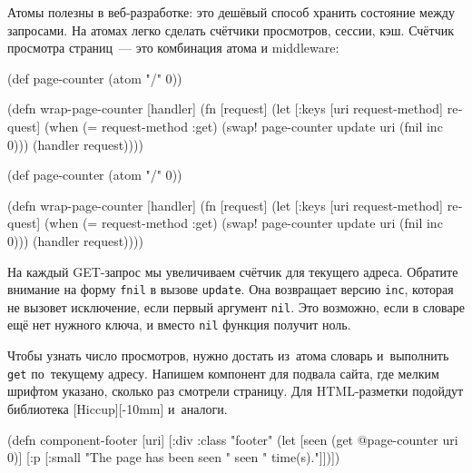 
Атомы полезны в веб-разработке: это дешёвый способ хранить состояние между
запросами. На атомах легко сделать счётчики просмотров, сессии, кэш. Счётчик
просмотра страниц~--- это комбинация атома и middleware:

\ifx\DEVICETYPE\MOBILE

\begin{english}
  \begin{clojure}
(def page-counter
  (atom {"/" 0}))

(defn wrap-page-counter
  [handler]
  (fn [request]
    (let [{:keys [uri request-method]}
          request]
      (when (= request-method :get)
        (swap! page-counter
          update uri (fnil inc 0)))
      (handler request))))
  \end{clojure}
\end{english}

\else

\begin{english}
  \begin{clojure}
(def page-counter
  (atom {"/" 0}))

(defn wrap-page-counter
  [handler]
  (fn [request]
    (let [{:keys [uri
                  request-method]} request]
      (when (= request-method :get)
        (swap! page-counter update uri (fnil inc 0)))
      (handler request))))
  \end{clojure}
\end{english}

\fi


На каждый GET-запрос мы увеличиваем счётчик для текущего адреса. Обратите
внимание на форму \verb|fnil| в вызове \verb|update|. Она возвращает версию
\verb|inc|, которая не вызовет исключение, если первый аргумент
\verb|nil|. Это возможно, если в словаре ещё нет нужного ключа, и вместо
\verb|nil| функция получит ноль.


Чтобы узнать число просмотров, нужно достать из~атома словарь и~выполнить
\verb|get| по~текущему адресу. Напишем компонент для подвала сайта, где мелким
шрифтом указано, сколько раз смотрели страницу. Для HTML-разметки подойдут
библиотека [Hiccup][-10mm]
и~аналоги.

\ifx\DEVICETYPE\MOBILE

\begin{english}
  \begin{clojure}
(defn component-footer [uri]
  [:div {:class "footer"}
   (let [seen (get @page-counter uri 0)]
     [:p [:small
          "The page has been seen " seen
          " time(s)."]])])
  \end{clojure}
\end{english}

